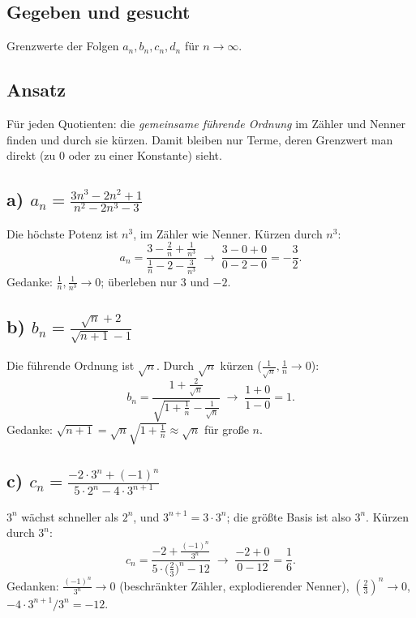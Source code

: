 

\subsection*{Gegeben und gesucht}
Grenzwerte der Folgen $a_n,b_n,c_n,d_n$ f\"ur $n\to\infty$.

\subsection*{Ansatz}
F\"ur jeden Quotienten: die \emph{gemeinsame f\"uhrende Ordnung} im
Z\"ahler und Nenner finden und durch sie k\"urzen. Damit bleiben nur
Terme, deren Grenzwert man direkt (zu $0$ oder zu einer Konstante) sieht.

\subsection*{a) $a_n=\frac{3n^3-2n^2+1}{n^2-2n^3-3}$}
Die h\"ochste Potenz ist $n^3$, im Z\"ahler wie Nenner. K\"urzen durch
$n^3$:
\begin{equation}
  a_n=\frac{3-\frac2n+\frac1{n^3}}{\frac1n-2-\frac3{n^3}}
  \;\to\; \frac{3-0+0}{0-2-0}=-\frac32 .
\end{equation}
Gedanke: $\tfrac1n,\tfrac1{n^3}\to0$; \"uberleben nur $3$ und $-2$.

\subsection*{b) $b_n=\frac{\sqrt n+2}{\sqrt{n+1}-1}$}
Die f\"uhrende Ordnung ist $\sqrt n$. Durch $\sqrt n$ k\"urzen
($\tfrac{1}{\sqrt n},\tfrac1n\to0$):
\begin{equation}
  b_n=\frac{1+\frac2{\sqrt n}}{\sqrt{1+\frac1n}-\frac1{\sqrt n}}
  \;\to\;\frac{1+0}{1-0}=1 .
\end{equation}
Gedanke: $\sqrt{n+1}=\sqrt{n}\sqrt{1+\tfrac1n}\approx\sqrt n$ f\"ur
gro\ss{}e $n$.

\subsection*{c) $c_n=\frac{-2\cdot3^n+(-1)^n}{5\cdot2^n-4\cdot3^{n+1}}$}
$3^n$ w\"achst schneller als $2^n$, und $3^{n+1}=3\cdot3^n$; die gr\"o\ss{}te
Basis ist also $3^n$. K\"urzen durch $3^n$:
\begin{equation}
  c_n=\frac{-2+\frac{(-1)^n}{3^n}}{5\cdot\bigl(\frac23\bigr)^n-12}
  \;\to\;\frac{-2+0}{0-12}=\frac16 .
\end{equation}
Gedanken: $\frac{(-1)^n}{3^n}\to0$ (beschr\"ankter Z\"ahler, explodierender
Nenner), $(\tfrac23)^n\to0$, $-4\cdot3^{n+1}/3^n=-12$.

